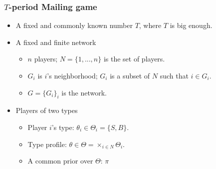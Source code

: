 \documentclass[9pt]{beamer}
\begin{document}
\begin{frame}
  \frametitle{$T$-period Mailing game}

\begin{itemize}
\item A fixed and commonly known number $T$, where $T$ is big enough.


\item A fixed and finite network
  \begin{itemize}
\item $n$ players; $N=\{1,...,n\}$ is the set of players. 
  \item $G_i$ is $i$'s neighborhood; $G_i$ is a subset of $N$ such that $i\in G_i$.
  
  \item $G=\{G_i\}_i$ is the network.
 
  \end{itemize}

\item Players of two types
\begin{itemize}
\item Player $i$'s type: $\theta_i\in \Theta_i=\{S,B\}$.
\item Type profile: $\theta\in \Theta=\times_{i\in N}\Theta_i$.
\item A common prior over $\Theta$: $\pi$
\end{itemize}



\end{itemize}

\end{frame}
\end{document}
